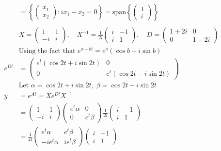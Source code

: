 \documentclass{article}
\begin{document}
\begin{align*}
    &= \left\{ \begin{pmatrix} x_1 \\ x_2 \end{pmatrix} : ix_1 - x_2 = 0 \right\}
    = \text{span}\left\{ \begin{pmatrix} 1 \\ i \end{pmatrix} \right\} \\
    \\
    &X = \begin{pmatrix} 1 & 1 \\ -i & i \end{pmatrix} , \quad
    X^{-1} = \frac{1}{2i} \begin{pmatrix} i & -1 \\ i & 1 \end{pmatrix} , \quad
    D = \begin{pmatrix} 1 + 2i & 0 \\ 0 & 1 - 2i \end{pmatrix} \\
    &\text{Using the fact that } e^{a + bi} = e^a(\cos b + i \sin b) \\
    e^{Dt} &= \begin{pmatrix} e^t(\cos 2t + i \sin 2t) & 0 \\ 0 & e^t(\cos 2t - i \sin 2t) \end{pmatrix} \\
    &\text{Let } \alpha = \cos 2t + i \sin 2t, \; \beta = \cos 2t - i \sin 2t \\
    y &= e^{At} = X e^{Dt} X^{-1} \\
    &= \begin{pmatrix} 1 & 1 \\ -i & i \end{pmatrix} \begin{pmatrix} e^t \alpha & 0 \\ 0 & e^t \beta \end{pmatrix} \frac{1}{2i} \begin{pmatrix} i & -1 \\ i & 1 \end{pmatrix} \\
    &= \frac{1}{2i} \begin{pmatrix} e^t \alpha & e^t \beta \\ -ie^t \alpha & ie^t \beta \end{pmatrix} \begin{pmatrix} i & -1 \\ i & 1 \end{pmatrix} \\

\end{align*}
\end{document}
